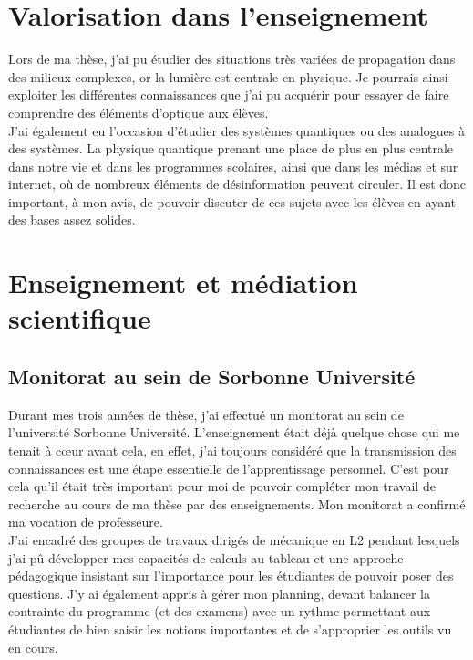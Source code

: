 \documentclass[a4paper,11pt]{article} %
\newcommand{\pointmedian}{\fontfamily{cmr}\selectfont\textperiodcentered}
\begin{document}
	\section{Valorisation dans l'enseignement}
	Lors de ma thèse, j'ai pu étudier des situations très variées de propagation dans des milieux complexes, or la lumière est centrale en physique. Je pourrais ainsi exploiter les différentes connaissances que j'ai pu acquérir pour essayer de faire comprendre des éléments d'optique aux élèves.\\
	
	J'ai également eu l'occasion d'étudier des systèmes quantiques ou des analogues à des systèmes. La physique quantique prenant une place de plus en plus centrale dans notre vie et dans les programmes scolaires, ainsi que dans les médias et sur internet, où de nombreux éléments de désinformation peuvent circuler. Il est donc important, à mon avis, de pouvoir discuter de ces sujets avec les élèves en ayant des bases assez solides.
	
	
	\section{Enseignement et médiation scientifique}
	\subsection{Monitorat au sein de Sorbonne Université}
	Durant mes trois années de thèse, j'ai effectué un monitorat au sein de l'université Sorbonne Université. L'enseignement était déjà quelque chose qui me tenait à cœur avant cela, en effet, j'ai toujours considéré que la transmission des connaissances est une étape essentielle de l'apprentissage personnel. C'est pour cela qu'il était très important pour moi de pouvoir compléter mon travail de recherche au cours de ma thèse par des enseignements. Mon monitorat a confirmé ma vocation de professeure.\\ 
	
	J'ai encadré des groupes de travaux dirigés de mécanique en L2 pendant lesquels j'ai pû développer mes capacités de calculs au tableau et une approche pédagogique insistant sur l'importance pour les étudiant\pointmedian es de pouvoir poser des questions. J'y ai également appris à gérer mon planning, devant balancer la contrainte du programme (et des examens) avec un rythme permettant aux étudiant\pointmedian es de bien saisir les notions importantes et de s'approprier les outils vu en cours.\\
	
\end{document}
